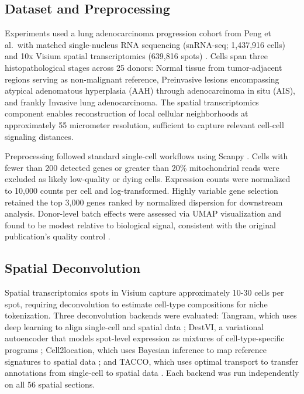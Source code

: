 \documentclass[conference]{IEEEtran}
\begin{document}
\subsection{Dataset and Preprocessing}

Experiments used a lung adenocarcinoma progression cohort from Peng et al.\ with matched single-nucleus RNA sequencing (snRNA-seq; 1,437,916 cells) and 10x Visium spatial transcriptomics (639,816 spots) \cite{Peng2025-xu}. Cells span three histopathological stages across 25 donors: Normal tissue from tumor-adjacent regions serving as non-malignant reference, Preinvasive lesions encompassing atypical adenomatous hyperplasia (AAH) through adenocarcinoma in situ (AIS), and frankly Invasive lung adenocarcinoma. The spatial transcriptomics component enables reconstruction of local cellular neighborhoods at approximately 55 micrometer resolution, sufficient to capture relevant cell-cell signaling distances.

Preprocessing followed standard single-cell workflows using Scanpy \cite{Virshup2023-tt}. Cells with fewer than 200 detected genes or greater than 20\% mitochondrial reads were excluded as likely low-quality or dying cells. Expression counts were normalized to 10,000 counts per cell and log-transformed. Highly variable gene selection retained the top 3,000 genes ranked by normalized dispersion for downstream analysis. Donor-level batch effects were assessed via UMAP visualization and found to be modest relative to biological signal, consistent with the original publication's quality control \cite{Luecken2022-at, Buttner2019-gh}.

\subsection{Spatial Deconvolution}

Spatial transcriptomics spots in Visium capture approximately 10-30 cells per spot, requiring deconvolution to estimate cell-type compositions for niche tokenization. Three deconvolution backends were evaluated: Tangram, which uses deep learning to align single-cell and spatial data \cite{Biancalani2021-bt}; DestVI, a variational autoencoder that models spot-level expression as mixtures of cell-type-specific programs \cite{Lopez2022-ps}; Cell2location, which uses Bayesian inference to map reference signatures to spatial data \cite{Kleshchevnikov2022-ki}; and TACCO, which uses optimal transport to transfer annotations from single-cell to spatial data \cite{Mages2023-wj}. Each backend was run independently on all 56 spatial sections.
\end{document}
